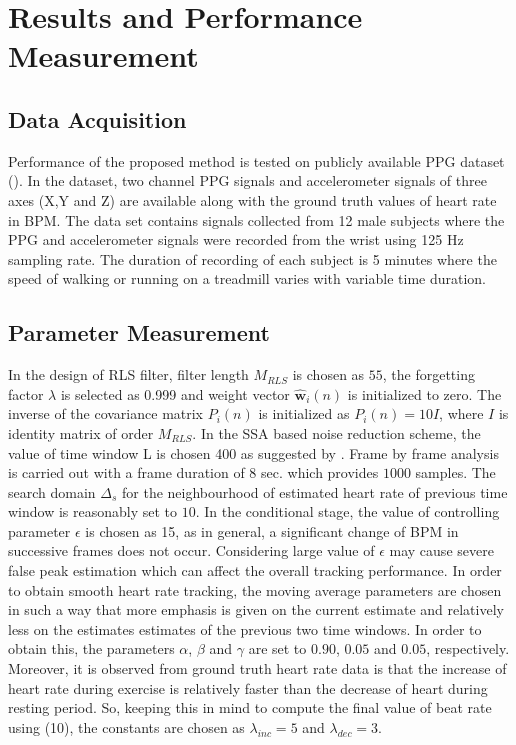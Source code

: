 \documentclass[final,3p,times,authoryear]{elsarticle}
\begin{document}
\section{Results and Performance Measurement}

\subsection{Data Acquisition}
Performance of the proposed method is tested on publicly available PPG dataset (\cite{bib:TROIKA}). In the dataset, two channel PPG signals and accelerometer signals of three axes (X,Y and Z) are available along with the ground truth values of heart rate in BPM. The data set contains signals collected from 12 male subjects where the PPG and accelerometer signals were recorded from the wrist using 125 Hz sampling rate. The duration of recording of each subject is 5 minutes where the speed of walking or running on a treadmill varies with variable time duration. 


\subsection{Parameter Measurement}

In the design of RLS filter, filter length $M_{RLS}$ is chosen as $55$, the forgetting factor $\lambda$ is selected as 0.999 and weight vector $\hat{\boldsymbol{w}}_i(n)$ is initialized to zero. The inverse of the covariance matrix $P_i(n)$ is initialized as $P_i(n)= 10I$, where $I$ is identity matrix of order $M_{RLS}$.
In the SSA based noise reduction scheme, the value of time window L is chosen
400 as suggested by \cite{bib:TROIKA}. Frame by frame analysis is carried out with a frame duration of $8$ sec. which provides $1000$ samples. The search domain $\Delta_s$ for the neighbourhood of estimated heart rate of previous time window is reasonably set to $10$. In the conditional stage, the value of controlling parameter $\epsilon$ is chosen as 15, as in general, a significant change of BPM in successive frames does not occur. Considering large value of $\epsilon$ may cause severe false peak estimation which can affect the overall tracking performance. In order to obtain smooth heart rate tracking, the moving average parameters are chosen in such a way that more emphasis is given on the current estimate and relatively less on the estimates estimates of the previous two time windows. In order to obtain this, the parameters $\alpha$, $\beta$ and $\gamma$ are set to $0.90$, $0.05$ and $0.05$, respectively. Moreover, it is observed from ground truth heart rate data is that the increase of heart rate during exercise is relatively faster than the decrease of heart during resting period. So, keeping this in mind to compute the final value of beat rate using (10), the constants are chosen as $\lambda_{inc} = 5$ and $\lambda_{dec} = 3$.
\end{document}
